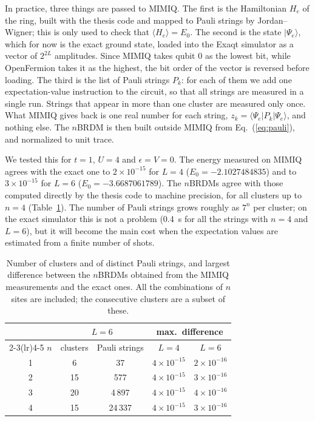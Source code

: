 \documentclass[11pt,a4paper]{article}
\begin{document}
In practice, three things are passed to MIMIQ. The first is the Hamiltonian
$H_e$ of the ring, built with the thesis code and mapped to Pauli strings by
Jordan--Wigner; this is only used to check that $\langle H_e \rangle = E_0$.
The second is the state $|\Psi_e\rangle$, which for now is the exact ground
state, loaded into the Exaqt simulator as a vector of $2^{2L}$ amplitudes. Since
MIMIQ takes qubit 0 as the lowest bit, while OpenFermion takes it as the
highest, the bit order of the vector is reversed before loading. The third is
the list of Pauli strings $P_k$: for each of them we add one expectation-value
instruction to the circuit, so that all strings are measured in a single run.
Strings that appear in more than one cluster are measured only once. What MIMIQ
gives back is one real number for each string,
$z_k = \langle \Psi_e | P_k | \Psi_e \rangle$, and nothing else. The $n$BRDM is
then built outside MIMIQ from Eq.~(\ref{eq:pauli}), and normalized to unit trace.

We tested this for $t = 1$, $U = 4$ and $\epsilon = V = 0$. The energy measured
on MIMIQ agrees with the exact one to $2\times10^{-15}$ for $L = 4$
($E_0 = -2.1027484835$) and to $3\times10^{-15}$ for $L = 6$
($E_0 = -3.6687061789$). The $n$BRDMs agree with those computed directly by
the thesis code to machine precision, for all clusters up to $n = 4$
(Table~\ref{tab:check}). The number of Pauli strings grows roughly as $7^n$
per cluster; on the exact simulator this is not a problem (0.4~s for all the
strings with $n = 4$ and $L = 6$), but it will become the main cost when the
expectation values are estimated from a finite number of shots.

\begin{table}[h]
\centering
\begin{tabular}{ccccc}
  \toprule
  & \multicolumn{2}{c}{$L=6$} & \multicolumn{2}{c}{max.\ difference} \\
  \cmidrule(lr){2-3}\cmidrule(lr){4-5}
  $n$ & clusters & Pauli strings & $L=4$ & $L=6$ \\
  \midrule
  1 & 6  & 37      & $4\times10^{-15}$ & $2\times10^{-16}$ \\
  2 & 15 & 577     & $4\times10^{-15}$ & $3\times10^{-16}$ \\
  3 & 20 & 4\,897  & $4\times10^{-15}$ & $4\times10^{-16}$ \\
  4 & 15 & 24\,337 & $4\times10^{-15}$ & $3\times10^{-16}$ \\
  \bottomrule
\end{tabular}
\caption{Number of clusters and of distinct Pauli strings, and largest
difference between the $n$BRDMs obtained from the MIMIQ measurements and the
exact ones. All the combinations of $n$ sites are included; the consecutive
clusters are a subset of these.}
\label{tab:check}
\end{table}
\end{document}
